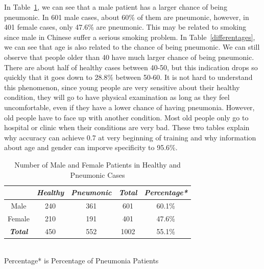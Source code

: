 \documentclass[journal]{IEEEtran}
\begin{document}
In Table~\ref{malefemale}, we can see that a male patient has a larger chance of being pneumonic. In 601 male cases, about 60\% of them are pneumonic, however, in 401 female cases, only 47.6\% are pneumonic. This may be related to smoking since male in Chinese suffer a serious smoking problem. 
In Table~\ref{differentages}, we can see that age is also related to the chance of being pneumonic. We can still observe that people older than 40 have much larger chance of being pneumonic. There are about half of healthy cases between 40-50, but this indication drops so quickly that it goes down to 28.8\% between 50-60. It is not hard to understand this phenomenon, since young people are very sensitive about their healthy condition, they will go to have physical examination as long as they feel uncomfortable, even if they have a lower chance of having pneumonia. However, old people have to face up with another condition. Most old people only go to hospital or clinic when their conditions are very bad. These two tables explain why accuracy can achieve 0.7 at very beginning of training and why information about age and gender can imporve specificity to 95.6\%.


\begin{table}[htb]
    \vspace{-0cm}
    \caption{Number of Male and Female Patients in Healthy and Pneumonic Cases}
    \vspace{-0cm}
    \begin{center}
    \begin{tabular}{|c|c|c|c|c|}
    \hline
    \textbf{\textit{}} & \textbf{\textit{Healthy}} & \textbf{\textit{Pneumonic}}& \textbf{\textit{Total}}& \textbf{\textit{Percentage*}} \\
    \hline
    Male & 240 & 361 & 601 & 60.1\%\\
    Female & 210 & 191 & 401 &47.6\% \\
    \hline
    \textbf{\textit{Total}} & 450 & 552 & 1002 & 55.1\% \\
    
    \hline
    \end{tabular}
    \vspace{0.1cm}
    \label{malefemale} \\
    \footnotesize{Percentage* is Percentage of Pneumonia Patients}

    \end{center}

    \vspace{-0.0cm}
    \end{table}
\end{document}
